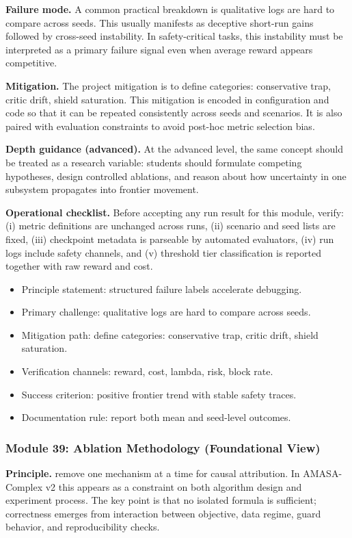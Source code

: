 \documentclass[conference]{IEEEtran}
\begin{document}
\textbf{Failure mode.} A common practical breakdown is qualitative logs are hard to compare across seeds. This usually manifests as deceptive short-run gains followed by cross-seed instability. In safety-critical tasks, this instability must be interpreted as a primary failure signal even when average reward appears competitive.

\textbf{Mitigation.} The project mitigation is to define categories: conservative trap, critic drift, shield saturation. This mitigation is encoded in configuration and code so that it can be repeated consistently across seeds and scenarios. It is also paired with evaluation constraints to avoid post-hoc metric selection bias.

\textbf{Depth guidance (advanced).} At the advanced level, the same concept should be treated as a research variable: students should formulate competing hypotheses, design controlled ablations, and reason about how uncertainty in one subsystem propagates into frontier movement.

\textbf{Operational checklist.} Before accepting any run result for this module, verify: (i) metric definitions are unchanged across runs, (ii) scenario and seed lists are fixed, (iii) checkpoint metadata is parseable by automated evaluators, (iv) run logs include safety channels, and (v) threshold tier classification is reported together with raw reward and cost.

\begin{itemize}[leftmargin=*]
  \item Principle statement: structured failure labels accelerate debugging.
  \item Primary challenge: qualitative logs are hard to compare across seeds.
  \item Mitigation path: define categories: conservative trap, critic drift, shield saturation.
  \item Verification channels: reward, cost, lambda, risk, block rate.
  \item Success criterion: positive frontier trend with stable safety traces.
  \item Documentation rule: report both mean and seed-level outcomes.
\end{itemize}


\subsubsection{Module 39: Ablation Methodology (Foundational View)}
\textbf{Principle.} remove one mechanism at a time for causal attribution. In AMASA-Complex v2 this appears as a constraint on both algorithm design and experiment process. The key point is that no isolated formula is sufficient; correctness emerges from interaction between objective, data regime, guard behavior, and reproducibility checks.
\end{document}
